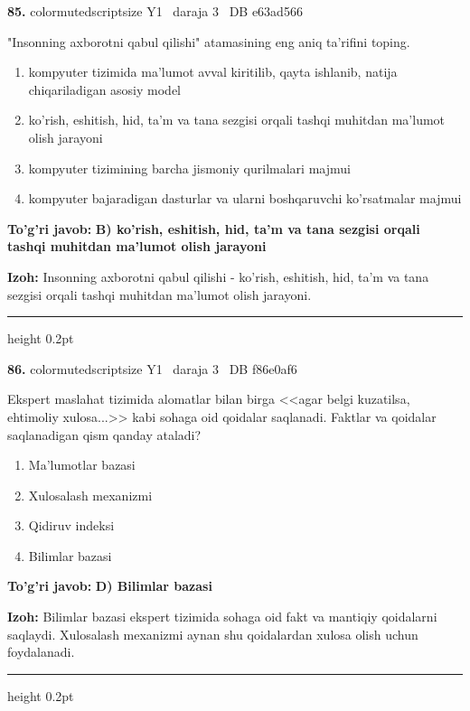 \documentclass[10pt,a4paper,oneside]{article}
\begin{document}
\noindent\textbf{\color{ink}85.}  {color{muted}scriptsize Y1 \textbullet\ daraja 3 \textbullet\ DB e63ad566}
\par
"Insonning axborotni qabul qilishi" atamasining eng aniq ta'rifini toping.
\begin{enumerate}[label=\Alph*),leftmargin=9mm]
\item kompyuter tizimida ma'lumot avval kiritilib, qayta ishlanib, natija chiqariladigan asosiy model
\item ko'rish, eshitish, hid, ta'm va tana sezgisi orqali tashqi muhitdan ma'lumot olish jarayoni
\item kompyuter tizimining barcha jismoniy qurilmalari majmui
\item kompyuter bajaradigan dasturlar va ularni boshqaruvchi ko'rsatmalar majmui
\end{enumerate}
\begin{tcolorbox}[enhanced,breakable,colback=teal!4,colframe=teal!50!black,boxrule=0.5pt,arc=1.1mm,left=3mm,right=3mm,top=1.7mm,bottom=1.7mm,before skip=2mm,after skip=2mm]
\textbf{\color{teal}To'g'ri javob:} \textbf{B) ko'rish, eshitish, hid, ta'm va tana sezgisi orqali tashqi muhitdan ma'lumot olish jarayoni}
\par\smallskip
\textbf{Izoh:} Insonning axborotni qabul qilishi - ko'rish, eshitish, hid, ta'm va tana sezgisi orqali tashqi muhitdan ma'lumot olish jarayoni.
\end{tcolorbox}
\vspace{2mm}\hrule height 0.2pt \vspace{3mm}

\noindent\textbf{\color{ink}86.}  {color{muted}scriptsize Y1 \textbullet\ daraja 3 \textbullet\ DB f86e0af6}
\par
Ekspert maslahat tizimida alomatlar bilan birga <<agar belgi kuzatilsa, ehtimoliy xulosa...>> kabi sohaga oid qoidalar saqlanadi. Faktlar va qoidalar saqlanadigan qism qanday ataladi?
\begin{enumerate}[label=\Alph*),leftmargin=9mm]
\item Ma'lumotlar bazasi
\item Xulosalash mexanizmi
\item Qidiruv indeksi
\item Bilimlar bazasi
\end{enumerate}
\begin{tcolorbox}[enhanced,breakable,colback=teal!4,colframe=teal!50!black,boxrule=0.5pt,arc=1.1mm,left=3mm,right=3mm,top=1.7mm,bottom=1.7mm,before skip=2mm,after skip=2mm]
\textbf{\color{teal}To'g'ri javob:} \textbf{D) Bilimlar bazasi}
\par\smallskip
\textbf{Izoh:} Bilimlar bazasi ekspert tizimida sohaga oid fakt va mantiqiy qoidalarni saqlaydi. Xulosalash mexanizmi aynan shu qoidalardan xulosa olish uchun foydalanadi.
\end{tcolorbox}
\vspace{2mm}\hrule height 0.2pt \vspace{3mm}
\end{document}
